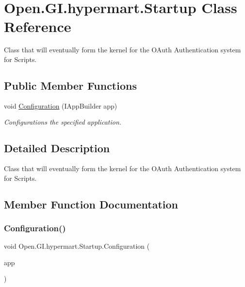 \hypertarget{class_open_1_1_g_i_1_1hypermart_1_1_startup}{}\section{Open.\+G\+I.\+hypermart.\+Startup Class Reference}
\label{class_open_1_1_g_i_1_1hypermart_1_1_startup}


Class that will eventually form the kernel for the O\+Auth Authentication system for Scripts.  


\subsection*{Public Member Functions}
\begin{DoxyCompactItemize}
\item 
void \hyperlink{class_open_1_1_g_i_1_1hypermart_1_1_startup_a92c0680464156e20b32f17ef38e08a83}{Configuration} (I\+App\+Builder app)
\begin{DoxyCompactList}\small\item\em Configurations the specified application. \end{DoxyCompactList}\end{DoxyCompactItemize}


\subsection{Detailed Description}
Class that will eventually form the kernel for the O\+Auth Authentication system for Scripts. 



\subsection{Member Function Documentation}
\hypertarget{class_open_1_1_g_i_1_1hypermart_1_1_startup_a92c0680464156e20b32f17ef38e08a83}{}\label{class_open_1_1_g_i_1_1hypermart_1_1_startup_a92c0680464156e20b32f17ef38e08a83} 
\subsubsection{\texorpdfstring{Configuration()}{Configuration()}}
{\footnotesize\ttfamily void Open.\+G\+I.\+hypermart.\+Startup.\+Configuration (\begin{DoxyParamCaption}\item[{I\+App\+Builder}]{app }\end{DoxyParamCaption})}



